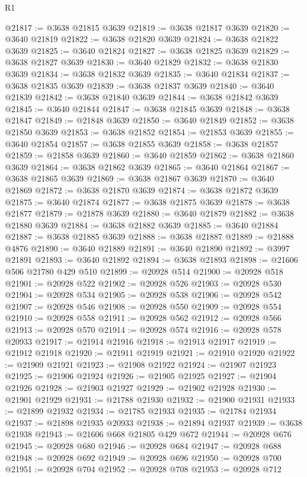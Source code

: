 \begin{lexlean}{R1}
\begin{coremodule}
@21817 := @3638 @21815 @3639
@21819 := @3638 @21817 @3639
@21820 := @3640 @21819
@21822 := @3638 @21820 @3639
@21824 := @3638 @21822 @3639
@21825 := @3640 @21824
@21827 := @3638 @21825 @3639
@21829 := @3638 @21827 @3639
@21830 := @3640 @21829
@21832 := @3638 @21830 @3639
@21834 := @3638 @21832 @3639
@21835 := @3640 @21834
@21837 := @3638 @21835 @3639
@21839 := @3638 @21837 @3639
@21840 := @3640 @21839
@21842 := @3638 @21840 @3639
@21844 := @3638 @21842 @3639
@21845 := @3640 @21844
@21847 := @3638 @21845 @3639
@21848 := @3638 @21847
@21849 := @21848 @3639
@21850 := @3640 @21849
@21852 := @3638 @21850 @3639
@21853 := @3638 @21852
@21854 := @21853 @3639
@21855 := @3640 @21854
@21857 := @3638 @21855 @3639
@21858 := @3638 @21857
@21859 := @21858 @3639
@21860 := @3640 @21859
@21862 := @3638 @21860 @3639
@21864 := @3638 @21862 @3639
@21865 := @3640 @21864
@21867 := @3638 @21865 @3639
@21869 := @3638 @21867 @3639
@21870 := @3640 @21869
@21872 := @3638 @21870 @3639
@21874 := @3638 @21872 @3639
@21875 := @3640 @21874
@21877 := @3638 @21875 @3639
@21878 := @3638 @21877
@21879 := @21878 @3639
@21880 := @3640 @21879
@21882 := @3638 @21880 @3639
@21884 := @3638 @21882 @3639
@21885 := @3640 @21884
@21887 := @3638 @21885 @3639
@21888 := @3638 @21887
@21889 := @21888 @4876
@21890 := @3640 @21889
@21891 := @3640 @21890
@21892 := @3997 @21891
@21893 := @3640 @21892
@21894 := @3638 @21893
@21898 := @21606 @506 @21780 @429 @510
@21899 := @20928 @514
@21900 := @20928 @518
@21901 := @20928 @522
@21902 := @20928 @526
@21903 := @20928 @530
@21904 := @20928 @534
@21905 := @20928 @538
@21906 := @20928 @542
@21907 := @20928 @546
@21908 := @20928 @550
@21909 := @20928 @554
@21910 := @20928 @558
@21911 := @20928 @562
@21912 := @20928 @566
@21913 := @20928 @570
@21914 := @20928 @574
@21916 := @20928 @578 @20933
@21917 := @21914 @21916
@21918 := @21913 @21917
@21919 := @21912 @21918
@21920 := @21911 @21919
@21921 := @21910 @21920
@21922 := @21909 @21921
@21923 := @21908 @21922
@21924 := @21907 @21923
@21925 := @21906 @21924
@21926 := @21905 @21925
@21927 := @21904 @21926
@21928 := @21903 @21927
@21929 := @21902 @21928
@21930 := @21901 @21929
@21931 := @21788 @21930
@21932 := @21900 @21931
@21933 := @21899 @21932
@21934 := @21785 @21933
@21935 := @21784 @21934
@21937 := @21898 @21935 @20933
@21938 := @21894 @21937
@21939 := @3638 @21938
@21943 := @21606 @668 @21805 @429 @672
@21944 := @20928 @676
@21945 := @20928 @680
@21946 := @20928 @684
@21947 := @20928 @688
@21948 := @20928 @692
@21949 := @20928 @696
@21950 := @20928 @700
@21951 := @20928 @704
@21952 := @20928 @708
@21953 := @20928 @712

\end{coremodule}
\end{lexlean}
